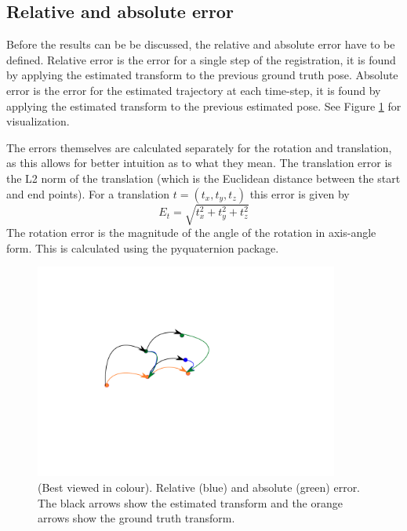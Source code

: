 \documentclass[12pt,a4paper]{article}
\begin{document}
  \subsection{Relative and absolute error}
    \label{ssec: res abs error}
    Before the results can be be discussed, the relative and absolute error have to be defined. Relative error is the error for a single step of the registration, it is found by applying the estimated transform to the previous ground truth pose. Absolute error is the error for the estimated trajectory at each time-step, it is found by applying the estimated transform to the previous estimated pose. See Figure \ref{f: rel and abs error} for visualization. 

    The errors themselves are calculated separately for the rotation and translation, as this allows for better intuition as to what they mean. The translation error is the L2 norm of the translation (which is the Euclidean distance between the start and end points). For a translation $t=(t_x,t_y,t_z)$ this error is given by
    \[
    E_t = \sqrt{t_x^2+t_y^2+t_z^2}
    \]
    The rotation error is the magnitude of the angle of the rotation in axis-angle form. This is calculated using the pyquaternion package.

    \begin{figure}[t!]
      \centering
        \includegraphics[width=100mm, trim =40mm 85mm 110mm 55mm, clip]{diags/errors.pdf}
      \caption{(Best viewed in colour). Relative (blue) and absolute (green) error. The black arrows show the estimated transform and the orange arrows show the ground truth transform.}
      \label{f: rel and abs error}
    \end{figure}
\end{document}
